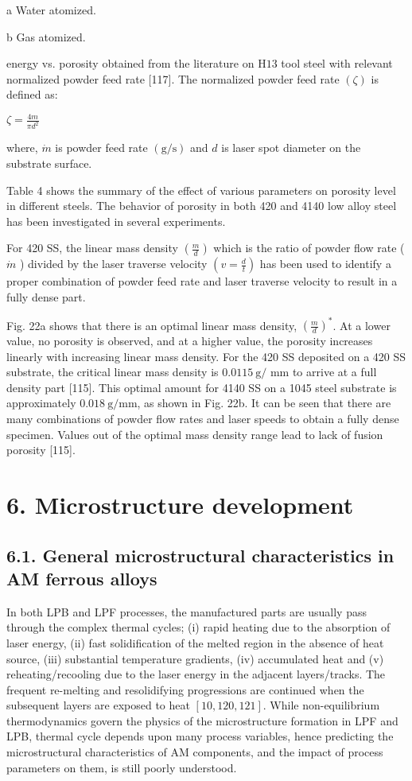 \documentclass[10pt]{article}
\begin{document}
a Water atomized.

b Gas atomized.

energy vs. porosity obtained from the literature on $\mathrm{H} 13$ tool steel with relevant normalized powder feed rate [117]. The normalized powder feed rate $(\zeta)$ is defined as:

$\zeta=\frac{4 m}{\pi d^{2}}$

where, $\dot{m}$ is powder feed rate $(\mathrm{g} / \mathrm{s})$ and $d$ is laser spot diameter on the substrate surface.

Table 4 shows the summary of the effect of various parameters on porosity level in different steels. The behavior of porosity in both 420 and 4140 low alloy steel has been investigated in several experiments.

For 420 SS, the linear mass density $\left(\frac{m}{d}\right)$ which is the ratio of powder flow rate ( $\dot{m}$ ) divided by the laser traverse velocity $\left(v=\frac{d}{t}\right)$ has been used to identify a proper combination of powder feed rate and laser traverse velocity to result in a fully dense part.

Fig. 22a shows that there is an optimal linear mass density, $\left(\frac{m}{d}\right)^{*}$. At a lower value, no porosity is observed, and at a higher value, the porosity increases linearly with increasing linear mass density. For the 420 SS deposited on a 420 SS substrate, the critical linear mass density is $0.0115 \mathrm{~g} /$ $\mathrm{mm}$ to arrive at a full density part [115]. This optimal amount for 4140 SS on a 1045 steel substrate is approximately $0.018 \mathrm{~g} / \mathrm{mm}$, as shown in Fig. 22b. It can be seen that there are many combinations of powder flow rates and laser speeds to obtain a fully dense specimen. Values out of the optimal mass density range lead to lack of fusion porosity [115].

\section*{6. Microstructure development}
\subsection*{6.1. General microstructural characteristics in AM ferrous alloys}
In both LPB and LPF processes, the manufactured parts are usually pass through the complex thermal cycles; (i) rapid heating due to the absorption of laser energy, (ii) fast solidification of the melted region in the absence of heat source, (iii) substantial temperature gradients, (iv) accumulated heat and (v) reheating/recooling due to the laser energy in the adjacent layers/tracks. The frequent re-melting and resolidifying progressions are continued when the subsequent layers are exposed to heat $[10,120,121]$. While non-equilibrium thermodynamics govern the physics of the microstructure formation in LPF and LPB, thermal cycle depends upon many process variables, hence predicting the microstructural characteristics of AM components, and the impact of process parameters on them, is still poorly understood.
\end{document}
